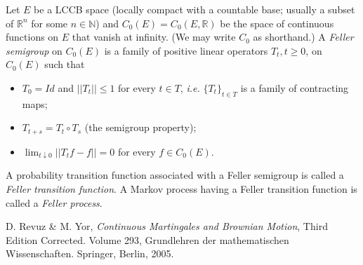 \documentclass[12pt]{article}
\begin{document}
Let $E$ be a LCCB space (locally compact with a countable base; usually a subset of $\mathbb{R}^n$ for some $n \in \mathbb{N}$) and $C_0(E) = C_0(E, \mathbb{R})$ be the space of continuous functions on $E$ that vanish at infinity.  (We may write $C_0$ as shorthand.)  A \emph{Feller semigroup} on $C_0(E)$ is a family of positive linear operators $T_t, t \geq 0$, on $C_0(E)$ such that 

\begin{itemize}
\item $T_0 = Id$ and $||T_t|| \leq 1$ for every $t \in T$, \emph{i.e.} $\{T_t\}_{t \in T}$ is a family of contracting maps; 
\item $T_{t+s} = T_t \circ T_s$ (the semigroup property); 
\item $\lim_{t \downarrow 0} ||T_tf - f|| = 0$ for every $f \in C_0(E)$.
\end{itemize}

A probability transition function associated with a Feller semigroup is called a \emph{Feller transition function}.  A Markov process having a Feller transition function is called a \emph{Feller process}.

\begin{thebibliography}{1}
 D. Revuz \& M. Yor, \emph{Continuous Martingales and Brownian Motion}, Third Edition Corrected.  Volume 293, Grundlehren der mathematischen Wissenschaften.  Springer, Berlin, 2005.
\end{thebibliography}

\end{document}
